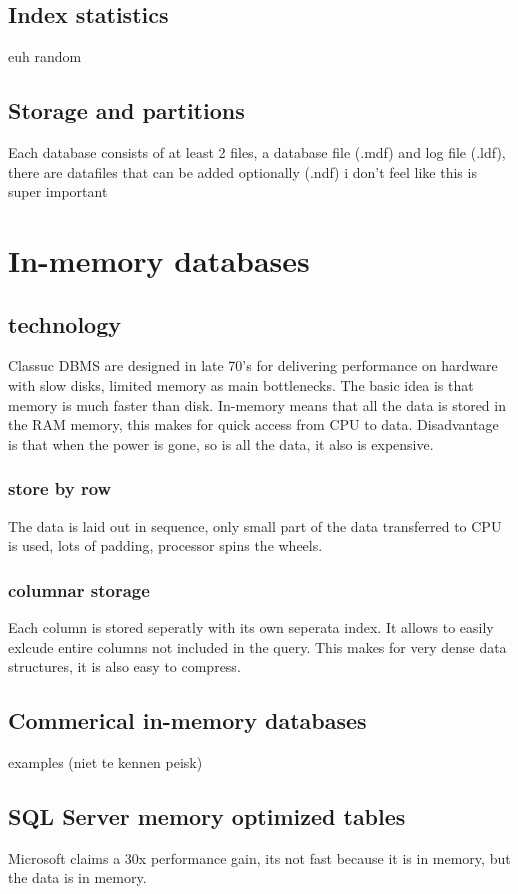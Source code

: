 \documentclass{report}
\begin{document}
		\section{Index statistics}
			euh random
		\section{Storage and partitions}
			Each database consists of at least 2 files, a database file (.mdf) and log file (.ldf), there are datafiles that can be added optionally (.ndf)
			i don't feel like this is super important

	\chapter{In-memory databases}
		\section{technology}
			Classuc DBMS are designed in late 70's for delivering performance on hardware with slow disks, limited memory as main bottlenecks. The basic idea is that memory is much faster than disk. In-memory means that all the data is stored in the RAM memory, this makes for quick access from CPU to data. Disadvantage is that when the power is gone, so is all the data, it also is expensive.
			\subsection{store by row}
				The data is laid out in sequence, only small part of the data transferred to CPU is used, lots of padding, processor spins the wheels.
			\subsection{columnar storage}
				Each column is stored seperatly with its own seperata index. It allows to easily exlcude entire columns not included in the query. This makes for very dense data structures, it is also easy to compress. 
		\section{Commerical in-memory databases}
			examples (niet te kennen peisk)
		\section{SQL Server memory optimized tables}
			Microsoft claims a 30x performance gain, its not fast because it is in memory, but the data is in memory.
\end{document}
